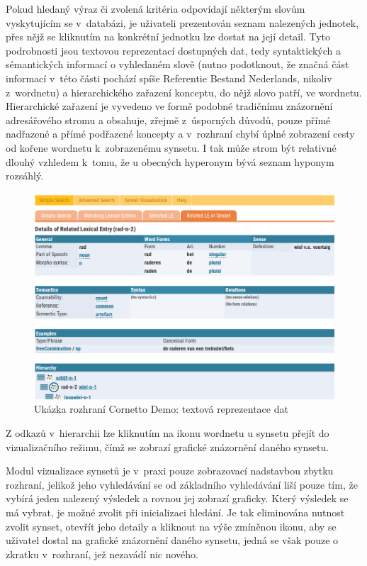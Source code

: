 \documentclass[a4paper,11pt,openany,twoside]{book}
\begin{document}
					Pokud hledaný výraz či zvolená kritéria odpovídají některým slovům vyskytujícím se v~databázi, je uživateli prezentován seznam nalezených jednotek, přes nějž se kliknutím na konkrétní jednotku lze dostat na její detail. Tyto podrobnosti jsou textovou reprezentací dostupných dat, tedy syntaktických a sémantických informací o vyhledaném slově (nutno podotknout, že značná část informací v~této části pochází spíše Referentie Bestand Nederlands, nikoliv z~wordnetu) a hierarchického zařazení konceptu, do nějž slovo patří, ve wordnetu. Hierarchické zařazení je vyvedeno ve formě podobné tradičnímu znázornění adresářového stromu a obsahuje, zřejmě z~úsporných důvodů, pouze přímé nadřazené a přímé podřazené koncepty a v~rozhraní chybí úplné zobrazení cesty od kořene wordnetu k~zobrazenému synsetu. I tak může strom být relativné dlouhý vzhledem k~tomu, že u obecných hyperonym bývá seznam hyponym rozsáhlý. 

					\begin{figure}[h]
						\centering
						\includegraphics[width=1.0\textwidth]{cornetto-text1.png}
						\caption{Ukázka rozhraní Cornetto Demo: textová reprezentace dat}
						\label{fig:cornetto-text1}
					\end{figure}

					Z odkazů v~hierarchii lze kliknutím na ikonu wordnetu u synsetu přejít do vizualizačního režimu, čímž se zobrazí grafické znázornění daného synsetu. 

					Modul vizualizace synsetů je v~praxi pouze zobrazovací nadstavbou zbytku rozhraní, jelikož jeho vyhledávání se od základního vyhledávání liší pouze tím, že vybírá jeden nalezený výsledek a rovnou jej zobrazí graficky. Který výsledek se má vybrat, je možné zvolit při inicializaci hledání. Je tak eliminována nutnost zvolit synset, otevřít jeho detaily a kliknout na výše zmíněnou ikonu, aby se uživatel dostal na grafické znázornění daného synsetu, jedná se však pouze o zkratku v~rozhraní, jež nezavádí nic nového.
\end{document}
